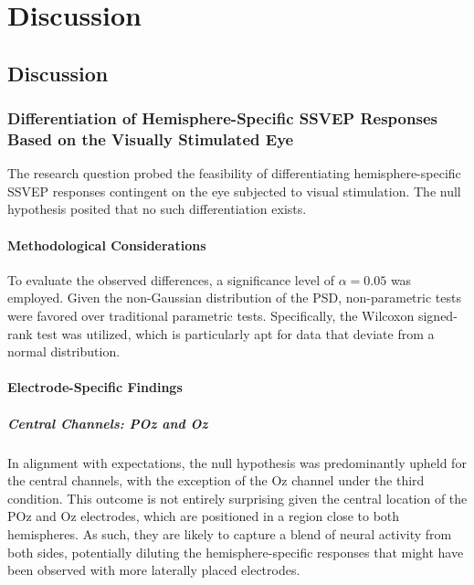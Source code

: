 \chapter{Discussion}\label{cha:discussion}

\section{Discussion}

\subsection{Differentiation of Hemisphere-Specific SSVEP Responses Based on the Visually Stimulated Eye}

The research question probed the feasibility of differentiating hemisphere-specific SSVEP responses contingent on the eye subjected to visual stimulation. The null hypothesis posited that no such differentiation exists.

\subsubsection{Methodological Considerations}

To evaluate the observed differences, a significance level of \( \alpha = 0.05 \) was employed. Given the non-Gaussian distribution of the PSD, non-parametric tests were favored over traditional parametric tests. Specifically, the Wilcoxon signed-rank test was utilized, which is particularly apt for data that deviate from a normal distribution.

\subsubsection{Electrode-Specific Findings}

\paragraph{Central Channels: POz and Oz}
In alignment with expectations, the null hypothesis was predominantly upheld for the central channels, with the exception of the Oz channel under the third condition. This outcome is not entirely surprising given the central location of the POz and Oz electrodes, which are positioned in a region close to both hemispheres. As such, they are likely to capture a blend of neural activity from both sides, potentially diluting the hemisphere-specific responses that might have been observed with more laterally placed electrodes.

